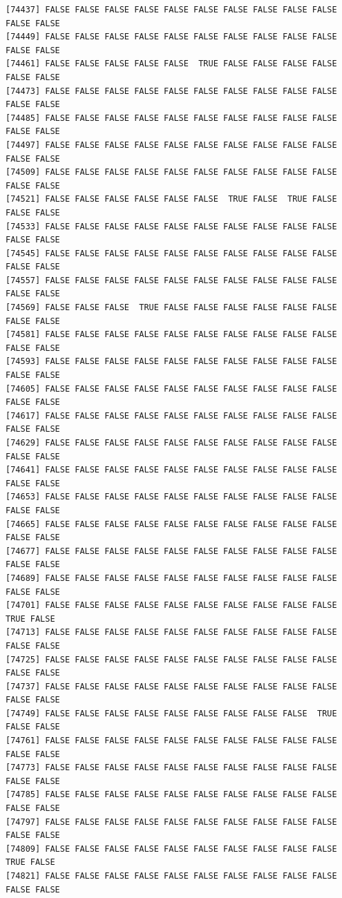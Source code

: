 \documentclass[
  a4paper,
  DIV=11,
  numbers=noendperiod]{scrartcl}
\begin{document}
\begin{verbatim}
[74437] FALSE FALSE FALSE FALSE FALSE FALSE FALSE FALSE FALSE FALSE FALSE FALSE
[74449] FALSE FALSE FALSE FALSE FALSE FALSE FALSE FALSE FALSE FALSE FALSE FALSE
[74461] FALSE FALSE FALSE FALSE FALSE  TRUE FALSE FALSE FALSE FALSE FALSE FALSE
[74473] FALSE FALSE FALSE FALSE FALSE FALSE FALSE FALSE FALSE FALSE FALSE FALSE
[74485] FALSE FALSE FALSE FALSE FALSE FALSE FALSE FALSE FALSE FALSE FALSE FALSE
[74497] FALSE FALSE FALSE FALSE FALSE FALSE FALSE FALSE FALSE FALSE FALSE FALSE
[74509] FALSE FALSE FALSE FALSE FALSE FALSE FALSE FALSE FALSE FALSE FALSE FALSE
[74521] FALSE FALSE FALSE FALSE FALSE FALSE  TRUE FALSE  TRUE FALSE FALSE FALSE
[74533] FALSE FALSE FALSE FALSE FALSE FALSE FALSE FALSE FALSE FALSE FALSE FALSE
[74545] FALSE FALSE FALSE FALSE FALSE FALSE FALSE FALSE FALSE FALSE FALSE FALSE
[74557] FALSE FALSE FALSE FALSE FALSE FALSE FALSE FALSE FALSE FALSE FALSE FALSE
[74569] FALSE FALSE FALSE  TRUE FALSE FALSE FALSE FALSE FALSE FALSE FALSE FALSE
[74581] FALSE FALSE FALSE FALSE FALSE FALSE FALSE FALSE FALSE FALSE FALSE FALSE
[74593] FALSE FALSE FALSE FALSE FALSE FALSE FALSE FALSE FALSE FALSE FALSE FALSE
[74605] FALSE FALSE FALSE FALSE FALSE FALSE FALSE FALSE FALSE FALSE FALSE FALSE
[74617] FALSE FALSE FALSE FALSE FALSE FALSE FALSE FALSE FALSE FALSE FALSE FALSE
[74629] FALSE FALSE FALSE FALSE FALSE FALSE FALSE FALSE FALSE FALSE FALSE FALSE
[74641] FALSE FALSE FALSE FALSE FALSE FALSE FALSE FALSE FALSE FALSE FALSE FALSE
[74653] FALSE FALSE FALSE FALSE FALSE FALSE FALSE FALSE FALSE FALSE FALSE FALSE
[74665] FALSE FALSE FALSE FALSE FALSE FALSE FALSE FALSE FALSE FALSE FALSE FALSE
[74677] FALSE FALSE FALSE FALSE FALSE FALSE FALSE FALSE FALSE FALSE FALSE FALSE
[74689] FALSE FALSE FALSE FALSE FALSE FALSE FALSE FALSE FALSE FALSE FALSE FALSE
[74701] FALSE FALSE FALSE FALSE FALSE FALSE FALSE FALSE FALSE FALSE  TRUE FALSE
[74713] FALSE FALSE FALSE FALSE FALSE FALSE FALSE FALSE FALSE FALSE FALSE FALSE
[74725] FALSE FALSE FALSE FALSE FALSE FALSE FALSE FALSE FALSE FALSE FALSE FALSE
[74737] FALSE FALSE FALSE FALSE FALSE FALSE FALSE FALSE FALSE FALSE FALSE FALSE
[74749] FALSE FALSE FALSE FALSE FALSE FALSE FALSE FALSE FALSE  TRUE FALSE FALSE
[74761] FALSE FALSE FALSE FALSE FALSE FALSE FALSE FALSE FALSE FALSE FALSE FALSE
[74773] FALSE FALSE FALSE FALSE FALSE FALSE FALSE FALSE FALSE FALSE FALSE FALSE
[74785] FALSE FALSE FALSE FALSE FALSE FALSE FALSE FALSE FALSE FALSE FALSE FALSE
[74797] FALSE FALSE FALSE FALSE FALSE FALSE FALSE FALSE FALSE FALSE FALSE FALSE
[74809] FALSE FALSE FALSE FALSE FALSE FALSE FALSE FALSE FALSE FALSE  TRUE FALSE
[74821] FALSE FALSE FALSE FALSE FALSE FALSE FALSE FALSE FALSE FALSE FALSE FALSE

\end{verbatim}
\end{document}

